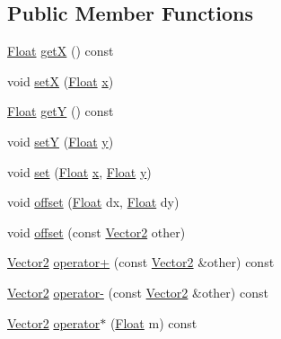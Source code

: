 \subsection*{Public Member Functions}
\begin{DoxyCompactItemize}
\item 
\hyperlink{namespaceZeta_a1e0a1265f9b3bd3075fb0fabd39088ba}{Float} \hyperlink{classZeta_1_1Vector2_a97b19b240b750ff9bc54ce87cead9ba0}{get\+X} () const 
\item 
void \hyperlink{classZeta_1_1Vector2_aa936a058b95cc983cd79f530115a3b1d}{set\+X} (\hyperlink{namespaceZeta_a1e0a1265f9b3bd3075fb0fabd39088ba}{Float} \hyperlink{classZeta_1_1Vector2_a88247cf58be67d2bf4d227b868a0102c}{x})
\item 
\hyperlink{namespaceZeta_a1e0a1265f9b3bd3075fb0fabd39088ba}{Float} \hyperlink{classZeta_1_1Vector2_a082be4175cad73ce65e8b1b9e01d04b4}{get\+Y} () const 
\item 
void \hyperlink{classZeta_1_1Vector2_a0e12bd6044758fbfc498d49f69788379}{set\+Y} (\hyperlink{namespaceZeta_a1e0a1265f9b3bd3075fb0fabd39088ba}{Float} \hyperlink{classZeta_1_1Vector2_ae6f0b675a313ecd00546812db89a177c}{y})
\item 
void \hyperlink{classZeta_1_1Vector2_a389a1d88c0c2cf2ff9b369d05b366911}{set} (\hyperlink{namespaceZeta_a1e0a1265f9b3bd3075fb0fabd39088ba}{Float} \hyperlink{classZeta_1_1Vector2_a88247cf58be67d2bf4d227b868a0102c}{x}, \hyperlink{namespaceZeta_a1e0a1265f9b3bd3075fb0fabd39088ba}{Float} \hyperlink{classZeta_1_1Vector2_ae6f0b675a313ecd00546812db89a177c}{y})
\item 
void \hyperlink{classZeta_1_1Vector2_abf1ce61fa1bde3cfcf026453822db6a9}{offset} (\hyperlink{namespaceZeta_a1e0a1265f9b3bd3075fb0fabd39088ba}{Float} dx, \hyperlink{namespaceZeta_a1e0a1265f9b3bd3075fb0fabd39088ba}{Float} dy)
\item 
void \hyperlink{classZeta_1_1Vector2_a981a86f741241808473a0f45900df46a}{offset} (const \hyperlink{classZeta_1_1Vector2}{Vector2} other)
\item 
\hyperlink{classZeta_1_1Vector2}{Vector2} \hyperlink{classZeta_1_1Vector2_ac6c48170d2cc109b759aa3f8536f48cd}{operator+} (const \hyperlink{classZeta_1_1Vector2}{Vector2} \&other) const 
\item 
\hyperlink{classZeta_1_1Vector2}{Vector2} \hyperlink{classZeta_1_1Vector2_a510b17c3c5f156240744e99083d740fb}{operator-\/} (const \hyperlink{classZeta_1_1Vector2}{Vector2} \&other) const 
\item 
\hyperlink{classZeta_1_1Vector2}{Vector2} \hyperlink{classZeta_1_1Vector2_a1682d8f529f8b6c0441a3e29d5e6b7ae}{operator$\ast$} (\hyperlink{namespaceZeta_a1e0a1265f9b3bd3075fb0fabd39088ba}{Float} m) const 

\end{DoxyCompactItemize}
